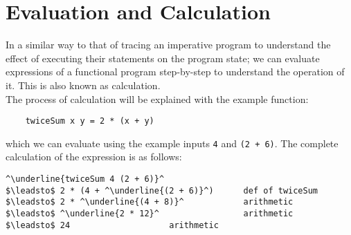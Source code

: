 
\section{Evaluation and Calculation}
In a similar way to that of tracing an imperative program to understand the effect of executing their statements on the program state; we can evaluate expressions of a functional program step-by-step to understand the operation of it. This is also known as calculation.\\

The process of calculation will be explained with the example function:
\begin{verbatim}
    twiceSum x y = 2 * (x + y)
\end{verbatim}
which we can evaluate using the example inputs \verb|4| and \verb|(2 + 6)|. The complete calculation of the expression is as follows:
\begin{lstlisting}[style=haskellTrace]
^\underline{twiceSum 4 (2 + 6)}^
$\leadsto$ 2 * (4 + ^\underline{(2 + 6)}^)      def of twiceSum
$\leadsto$ 2 * ^\underline{(4 + 8)}^            arithmetic
$\leadsto$ ^\underline{2 * 12}^                 arithmetic
$\leadsto$ 24                    arithmetic
\end{lstlisting}


